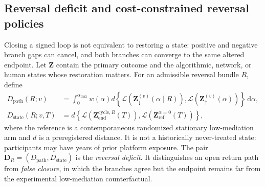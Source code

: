 \documentclass[10pt,a4paper]{article}
\newcommand{\alphamax}{\alpha_{\max}}
\newcommand{\dd}{\mathrm{d}}
\begin{document}
\subsection{Reversal deficit and cost-constrained reversal policies}

Closing a signed loop is not equivalent to restoring a state: positive and negative branch gaps can cancel, and both branches can converge to the same altered endpoint. Let $\bm Z$ contain the primary outcome and the algorithmic, network, or human states whose restoration matters. For an admissible reversal bundle $R$, define
\begin{align}
D_{\mathrm{path}}(R;v)
&=\int_0^{\alphamax}w(\alpha)
d\!\left\{\mathcal L(\bm Z_{\downarrow}^{(v)}(\alpha\mid R)),
\mathcal L(\bm Z_{\uparrow}^{(v)}(\alpha))\right\}\,\dd\alpha,
\label{eq:path-deficit}\\
D_{\mathrm{state}}(R;v,T)
&=d\!\left\{\mathcal L(\bm Z_{\mathrm{end}}^{\mathrm{cycle},R}(T)),
\mathcal L(\bm Z_{\mathrm{ref}}^{\alpha=0}(T))\right\},
\label{eq:state-deficit}
\end{align}
where the reference is a contemporaneous randomized stationary low-mediation arm and $d$ is a preregistered distance. It is not a historically never-treated state: participants may have years of prior platform exposure. The pair $\bm D_R=(D_{\mathrm{path}},D_{\mathrm{state}})$ is the \emph{reversal deficit}. It distinguishes an open return path from \emph{false closure}, in which the branches agree but the endpoint remains far from the experimental low-mediation counterfactual.
\end{document}
